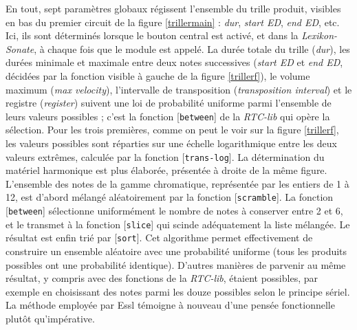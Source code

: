 \documentclass[a4paper,12pt]{article}
\newcommand{\patch}[1]{[\texttt{#1}]}
\begin{document}
En tout, sept paramètres globaux régissent l'ensemble du trille produit, visibles en bas du premier circuit de la figure \ref{trillermain} : \emph{dur}, \emph{start ED}, \emph{end ED}, etc. Ici, ils sont déterminés lorsque le bouton central est activé, et dans la \emph{Lexikon-Sonate}, à chaque fois que le module est appelé. La durée totale du trille (\emph{dur}), les durées minimale et maximale entre deux notes successives (\emph{start ED} et \emph{end ED}, décidées par la fonction visible à gauche de la figure \ref{trillerf}), le volume maximum (\emph{max velocity}), l'intervalle de transposition (\emph{transposition interval}) et le registre (\emph{register}) suivent une loi de probabilité uniforme parmi l'ensemble de leurs valeurs possibles ; c'est la fonction \patch{between} de la \emph{RTC-lib} qui opère la sélection. Pour les trois premières, comme on peut le voir sur la figure \ref{trillerf}, les valeurs possibles sont réparties sur une échelle logarithmique entre les deux valeurs extrêmes, calculée par la fonction \patch{trans-log}. La détermination du matériel harmonique est plus élaborée, présentée à droite de la même figure. L'ensemble des notes de la gamme chromatique, représentée par les entiers de 1 à 12, est d'abord mélangé aléatoirement par la fonction \patch{scramble}. La fonction \patch{between} sélectionne uniformément le nombre de notes à conserver entre 2 et 6, et le transmet à la fonction \patch{slice} qui scinde adéquatement la liste mélangée. Le résultat est enfin trié par \patch{sort}. Cet algorithme permet effectivement de construire un ensemble aléatoire avec une probabilité uniforme (tous les produits possibles ont une probabilité identique). D'autres manières de parvenir au même résultat, y compris avec des fonctions de la \emph{RTC-lib}, étaient possibles, par exemple en choisissant des notes parmi les douze possibles selon le principe sériel. La méthode employée par Essl témoigne à nouveau d'une pensée fonctionnelle plutôt qu'impérative.
\end{document}
